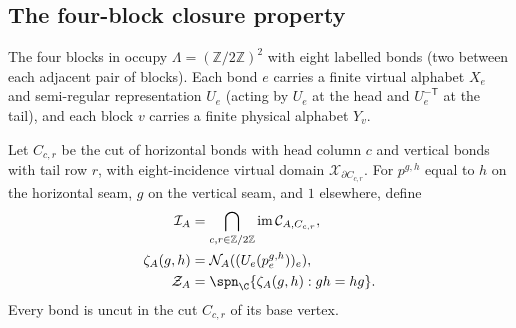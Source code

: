 \subsection{The four-block closure property}
\label{sec:peps_full_four_cut_closure}

The four blocks in \cite[Theorem~5.5]{Schuch2010PEPS} occupy
$\Lambda=(\mathbb Z/2\mathbb Z)^2$ with eight labelled bonds (two between
each adjacent pair of blocks). Each bond $e$ carries a finite virtual
alphabet $X_e$ and semi-regular representation $U_e$ (acting by $U_e$ at
the head and $U_e^{-\mathsf T}$ at the tail), and each block $v$ carries a
finite physical alphabet $Y_v$.

\begin{definition}%
    \label{def:peps_full_four_cut_space}
    \leanok
    Let $C_{c,r}$ be the cut of horizontal bonds with head column $c$ and
    vertical bonds with tail row $r$, with eight-incidence virtual domain
    $\mathcal X_{\partial C_{c,r}}$. For $p^{g,h}$ equal to $h$ on the
    horizontal seam, $g$ on the vertical seam, and $1$ elsewhere, define
    \begin{align}
        \mathcal I_A & =\bigcap_{c,r\in\mathbb Z/2\mathbb Z}
        \operatorname{im}\mathcal C_{A,C_{c,r}},
        \label{eq:peps_full_four_cut_space}                  \\
        \zeta_A(g,h) & =\mathcal N_A((U_e(p^{g,h}_e))_e),
        \label{eq:peps_full_four_cut_closure}                \\
        \mathcal Z_A & =\spn_{\C}\{\zeta_A(g,h):gh=hg\}.
        \label{eq:peps_full_four_cut_closure_span}
    \end{align}
    Every bond is uncut in the cut $C_{c,r}$ of its base vertex.
\end{definition}

